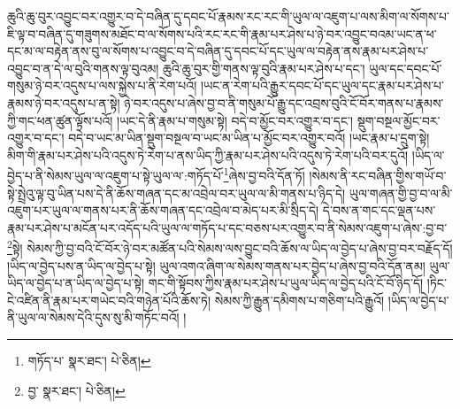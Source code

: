 ཆུའི་ཆུ་བུར་འབྱུང་བར་འགྱུར་བ་དེ་བཞིན་དུ་དབང་པོ་རྣམས་རང་རང་གི་ཡུལ་ལ་འཇུག་པ་ལས་མིག་ལ་སོགས་པ་ཇི་ལྟ་བ་བཞིན་དུ་གཟུགས་མཐོང་བ་ལ་སོགས་པའི་རང་རང་གི་རྣམ་པར་ཤེས་པ་ཉེ་བར་འབྱུང་བའམ་ཡང་ན་ཕ་དང་མ་ལ་བརྟེན་ནས་བུ་ལ་སོགས་པ་འབྱུང་བ་དེ་བཞིན་དུ་དབང་པོ་དང་ཡུལ་ལ་བརྟེན་ནས་རྣམ་པར་ཤེས་པ་འབྱུང་བ་ན་དེ་ལ་བུའི་གནས་ལྟ་བུའམ། ཆུའི་ཆུ་བུར་གྱི་གནས་ལྟ་བུའི་རྣམ་པར་ཤེས་པ་དང་། ཡུལ་དང་དབང་པོ་གསུམ་ཉེ་བར་འདུས་པ་ལས་སྐྱེས་པ་ནི་རེག་པའོ། །ཡང་ན་རེག་པའི་རྒྱུར་དབང་པོ་དང་ཡུལ་དང་རྣམ་པར་ཤེས་པ་རྣམས་ཉེ་བར་འདུས་པ་ན་སྟེ། ཉེ་བར་འདུས་པ་ཞེས་བྱ་བ་ནི་གསུམ་པོ་རྒྱུ་དང་འབྲས་བུའི་ངོ་བོར་གནས་པ་རྣམས་ཀྱི་གང་ཕན་ཚུན་ལྟོས་པའོ། །ཡང་དེ་ནི་རྣམ་པ་གསུམ་སྟེ། བདེ་བ་མྱོང་བར་འགྱུར་བ་དང་། སྡུག་བསྔལ་མྱོང་བར་འགྱུར་བ་དང་། བདེ་བ་ཡང་མ་ཡིན་སྡུག་བསྔལ་བ་ཡང་མ་ཡིན་པ་མྱོང་བར་འགྱུར་བའོ། །ཡང་རྣམ་པ་དྲུག་སྟེ། མིག་གི་རྣམ་པར་ཤེས་པའི་འདུས་ཏེ་རེག་པ་ནས་ཡིད་ཀྱི་རྣམ་པར་ཤེས་པའི་འདུས་ཏེ་རེག་པའི་བར་དུའོ། །ཡིད་ལ་བྱེད་པ་ནི་སེམས་ཡུལ་ལ་འཇུག་པ་སྟེ་ཡུལ་ལ་:གཏོད་པོ་\footnote{གཏོད་པ་  སྣར་ཐང་།  པེ་ཅིན། }ཞེས་བྱ་བའི་དོན་ཏོ། །སེམས་ནི་རང་བཞིན་གྱིས་གཡོ་བ་སྟེ་སྤྲེའུ་ལྟ་བུ་ཡིན་པས་དེ་ནི་ཆོས་གཞན་དང་མ་འབྲེལ་བར་ཡུལ་ལ་མི་གནས་པ་ཉིད་དེ། ཡུལ་གཞན་གྱི་བྱ་བ་ལ་མི་འཇུག་པར་ཡུལ་ལ་གནས་པར་ནི་ཆོས་གཞན་དང་འབྲེལ་བ་མེད་པར་མི་སྲིད་དེ། དེ་བས་ན་གང་དང་ལྡན་པས་རྣམ་པར་ཤེས་པ་མངོན་པར་འདོད་པའི་ཡུལ་ལ་གཏོད་པ་དང་བཅས་པར་འགྱུར་བ་ནི་སེམས་འཇུག་པ་ཞེས་:བྱ་བ་\footnote{བྱ་  སྣར་ཐང་།  པེ་ཅིན། }སྟེ། སེམས་ཀྱི་བྱ་བའི་ངོ་བོར་ཉེ་བར་མཚོན་པའི་སེམས་ལས་བྱུང་བའི་ཆོས་ལ་ཡིད་ལ་བྱེད་པ་ཞེས་བྱ་བར་བརྗོད་དོ། །ཡིད་ལ་བྱེད་པས་ན་ཡིད་ལ་བྱེད་པ་སྟེ། ཡུལ་འགའ་ཞིག་ལ་སེམས་གནས་པར་བྱེད་པ་ཞེས་བྱ་བའི་དོན་ནམ། ཡུལ་ཡིད་ལ་བྱེད་པ་ན་ཡིད་ལ་བྱེད་པ་སྟེ། གང་གི་སྟོབས་ཀྱིས་རྣམ་པར་ཤེས་པ་ཡུལ་ཡིད་ལ་བྱེད་པའི་ངོ་བོ་ཉིད་དོ། །ཏིང་ངེ་འཛིན་ནི་རྣམ་པར་གཡེང་བའི་གཉེན་པོའི་ཆོས་ཏེ། སེམས་ཀྱི་རྒྱུན་དམིགས་པ་གཅིག་པའི་རྒྱུའོ། །ཡིད་ལ་བྱེད་པ་ནི་ཡུལ་ལ་སེམས་དེའི་དུས་སུ་མི་གཏོང་བའོ། །
